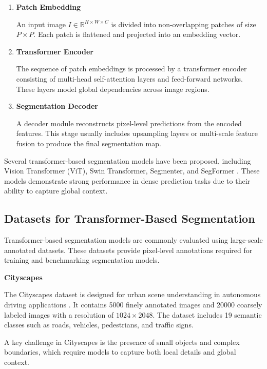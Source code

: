 \begin{enumerate}
\item \textbf{Patch Embedding}

An input image $I \in \mathbb{R}^{H \times W \times C}$ is divided into non-overlapping patches of size $P \times P$. 
Each patch is flattened and projected into an embedding vector.

\item \textbf{Transformer Encoder}

The sequence of patch embeddings is processed by a transformer encoder consisting of multi-head self-attention layers and feed-forward networks. 
These layers model global dependencies across image regions.

\item \textbf{Segmentation Decoder}

A decoder module reconstructs pixel-level predictions from the encoded features. 
This stage usually includes upsampling layers or multi-scale feature fusion to produce the final segmentation map.
\end{enumerate}

Several transformer-based segmentation models have been proposed, including Vision Transformer (ViT), Swin Transformer, Segmenter, and SegFormer \cite{dosovitskiy2020image,liu2021swin,xie2021segformer,strudel2021segmenter}. 
These models demonstrate strong performance in dense prediction tasks due to their ability to capture global context.

\subsection{Datasets for Transformer-Based Segmentation}

Transformer-based segmentation models are commonly evaluated using large-scale annotated datasets. 
These datasets provide pixel-level annotations required for training and benchmarking segmentation models.

\textbf{Cityscapes}

The Cityscapes dataset is designed for urban scene understanding in autonomous driving applications \cite{cordts2016cityscapes}. 
It contains 5000 finely annotated images and 20000 coarsely labeled images with a resolution of $1024 \times 2048$. 
The dataset includes 19 semantic classes such as roads, vehicles, pedestrians, and traffic signs.

A key challenge in Cityscapes is the presence of small objects and complex boundaries, which require models to capture both local details and global context.

